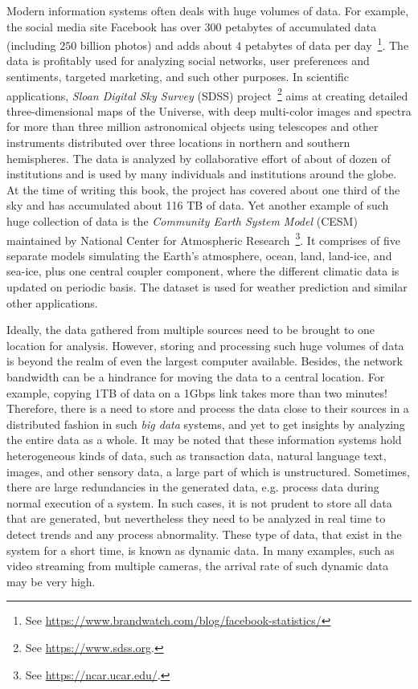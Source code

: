 
Modern information systems often deals with huge volumes of data. For example, the social media site Facebook has over $300$ petabytes 
of accumulated data (including $250$ billion photos) and adds about $4$ petabytes of data per day~\footnote{See 
\url{https://www.brandwatch.com/blog/facebook-statistics/}}. The data is profitably used for analyzing social 
networks, user preferences and sentiments, targeted marketing, and such other purposes. 
%
In scientific applications, {\em Sloan Digital Sky Survey} (SDSS) project~\footnote{See \url{https://www.sdss.org}.} aims at creating 
detailed three-dimensional maps of the Universe, with deep multi-color images and spectra for more than three million astronomical 
objects using telescopes and other instruments distributed over three locations in northern and southern hemispheres. The data 
is analyzed by collaborative effort of about of dozen of institutions and is used by many individuals and institutions around the 
globe. At the time of writing this book, the project has covered about one third of the sky and has accumulated about 116 TB of data. 
%
Yet another example of such huge collection of data is the {\em Community Earth System Model} (CESM) maintained by National Center 
for Atmospheric Research~\footnote{See \url{https://ncar.ucar.edu/}.}. It comprises of five separate models simulating the Earth's 
atmosphere, ocean, land, land-ice, and sea-ice, plus one central coupler component, where the different climatic data is updated 
on periodic basis. The dataset is used for weather prediction and similar other applications.

Ideally, the data gathered from multiple sources need to be brought to one location for analysis. However, storing and processing 
such huge volumes of data is beyond the realm of even the largest computer available. Besides, the network bandwidth can be a 
hindrance for moving the data to a central location. For example, copying 1TB of data on a 1Gbps link takes more than two minutes!
%
Therefore, there is a need to store and process the data close to their sources in a distributed fashion in such {\em big data}
systems, and yet to get insights by analyzing the entire data as a whole. It may be noted that these information systems hold 
heterogeneous kinds of data, such as transaction data, natural language text, images, and other sensory data, a large part of 
which is unstructured.
Sometimes, there are large redundancies in the generated data, e.g. process data during normal execution of a system. In such
cases, it is not prudent to store all data that are generated, but nevertheless they need to be analyzed in real time to 
detect trends and any process abnormality. These type of data, that exist in the system for a short time, is known as dynamic
data. In many examples, such as video streaming from multiple cameras, the arrival rate of such dynamic data may be very high.

